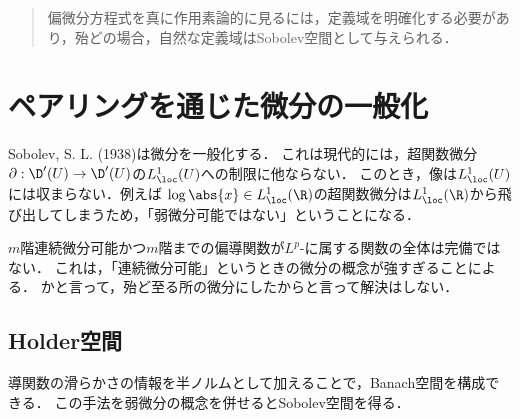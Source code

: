 \documentclass[uplatex,dvipdfmx]{jsreport}
\begin{document}
\begin{quotation}
    偏微分方程式を真に作用素論的に見るには，定義域を明確化する必要があり，殆どの場合，自然な定義域はSobolev空間として与えられる．
\end{quotation}

\section{ペアリングを通じた微分の一般化}

\begin{tcolorbox}[colframe=ForestGreen, colback=ForestGreen!10!white,breakable,colbacktitle=ForestGreen!40!white,coltitle=black,fonttitle=\bfseries\sffamily,
title=]
    Sobolev, S. L. (1938)は微分を一般化する．
    これは現代的には，超関数微分$\partial:\D'(U)\to\D'(U)$の$L^1_\loc(U)$への制限に他ならない．
    このとき，像は$L^1_\loc(U)$には収まらない．例えば
    $\log\abs{x}\in L^1_\loc(\R)$の超関数微分は$L^1_\loc(\R)$から飛び出してしまうため，「弱微分可能ではない」ということになる．
\end{tcolorbox}

\begin{observation}
    $m$階連続微分可能かつ$m$階までの偏導関数が$L^p$-に属する関数の全体は完備ではない．
    これは，「連続微分可能」というときの微分の概念が強すぎることによる．
    かと言って，殆ど至る所の微分にしたからと言って解決はしない．
\end{observation}

\subsection{Holder空間}

\begin{tcolorbox}[colframe=ForestGreen, colback=ForestGreen!10!white,breakable,colbacktitle=ForestGreen!40!white,coltitle=black,fonttitle=\bfseries\sffamily,
title=]
    導関数の滑らかさの情報を半ノルムとして加えることで，Banach空間を構成できる．
    この手法を弱微分の概念を併せるとSobolev空間を得る．
\end{tcolorbox}
\end{document}
